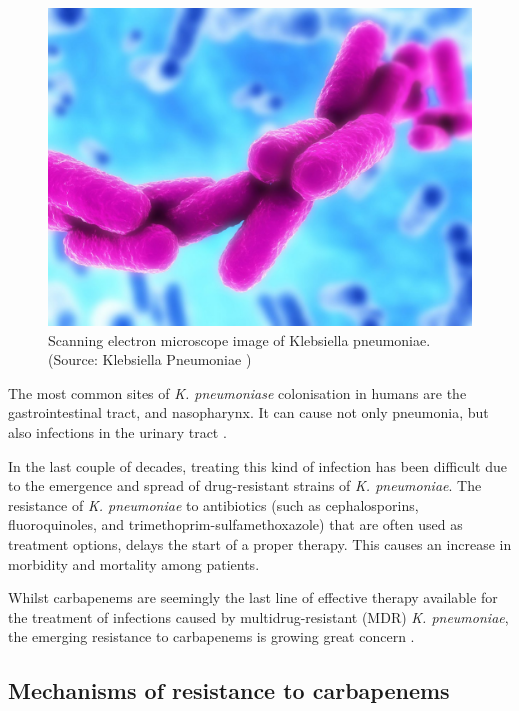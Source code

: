 \documentclass[11pt]{report}
\begin{document}
\begin{figure}[htp]
\centering
\includegraphics[scale=0.30]{img/klebsiella.jpg}
\caption{Scanning electron microscope image of Klebsiella pneumoniae.\\
(Source: Klebsiella Pneumoniae \cite{klebsiella})}
\label{klebsiella}
\end{figure}

The most common sites of \emph{K. pneumoniase} colonisation in humans are the gastrointestinal tract, and nasopharynx.
It can cause not only pneumonia, but also infections in the urinary tract \cite{pitout2015, podschun1998}.

In the last couple of decades, treating this kind of infection has been difficult due to the emergence and spread of drug-resistant strains of \emph{K. pneumoniae}.
The resistance of \emph{K. pneumoniae} to antibiotics (such as cephalosporins, fluoroquinoles, and trimethoprim-sulfamethoxazole) that are often used as treatment options, delays the start of a proper therapy.
This causes an increase in morbidity and mortality among patients.

Whilst carbapenems are seemingly the last line of effective therapy available for the treatment of infections caused by multidrug-resistant (MDR) \emph{K. pneumoniae}, the emerging resistance to carbapenems is growing great concern
 \cite{pitout2015}.

\subsection{Mechanisms of resistance to carbapenems} 
\end{document}
